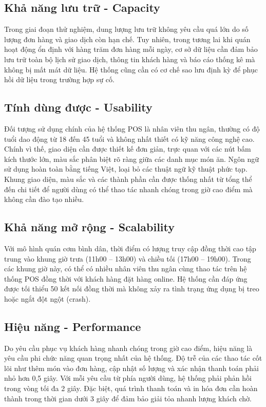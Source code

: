 \documentclass[../20232006p.tex]{subfiles}
\begin{document}
\subsection{Khả năng lưu trữ - Capacity}
Trong giai đoạn thử nghiệm, dung lượng lưu trữ không yêu cầu quá lớn do số lượng đơn hàng và giao dịch còn hạn chế. Tuy nhiên, trong tương lai khi quán hoạt động ổn định với hàng trăm đơn hàng mỗi ngày, cơ sở dữ liệu cần đảm bảo lưu trữ toàn bộ lịch sử giao dịch, thông tin khách hàng và báo cáo thống kê mà không bị mất mát dữ liệu. Hệ thống cũng cần có cơ chế sao lưu định kỳ để phục hồi dữ liệu trong trường hợp sự cố.
\subsection{Tính dùng được - Usability}
Đối tượng sử dụng chính của hệ thống POS là nhân viên thu ngân, thường có độ tuổi dao động từ 18 đến 45 tuổi và không nhất thiết có kỹ năng công nghệ cao. Chính vì thế, giao diện cần được thiết kế đơn giản, trực quan với các nút bấm kích thước lớn, màu sắc phân biệt rõ ràng giữa các danh mục món ăn. Ngôn ngữ sử dụng hoàn toàn bằng tiếng Việt, loại bỏ các thuật ngữ kỹ thuật phức tạp. Khung giao diện, màu sắc và các thành phần cần được thống nhất từ tổng thể đến chi tiết để người dùng có thể thao tác nhanh chóng trong giờ cao điểm mà không cần đào tạo nhiều.
\subsection{Khả năng mở rộng - Scalability}
Với mô hình quán cơm bình dân, thời điểm có lượng truy cập đồng thời cao tập trung vào khung giờ trưa (11h00 – 13h00) và chiều tối (17h00 – 19h00). Trong các khung giờ này, có thể có nhiều nhân viên thu ngân cùng thao tác trên hệ thống POS đồng thời với khách hàng đặt hàng online. Hệ thống cần đáp ứng được tối thiểu 50 kết nối đồng thời mà không xảy ra tình trạng ứng dụng bị treo hoặc ngắt đột ngột (crash).
\subsection{Hiệu năng - Performance}
Do yêu cầu phục vụ khách hàng nhanh chóng trong giờ cao điểm, hiệu năng là yêu cầu phi chức năng quan trọng nhất của hệ thống. Độ trễ của các thao tác cốt lõi như thêm món vào đơn hàng, cập nhật số lượng và xác nhận thanh toán phải nhỏ hơn 0,5 giây. Với mỗi yêu cầu từ phía người dùng, hệ thống phải phản hồi trong vòng tối đa 2 giây. Đặc biệt, quá trình thanh toán và in hóa đơn cần hoàn thành trong thời gian dưới 3 giây để đảm bảo giải tỏa nhanh lượng khách chờ.
\end{document}
